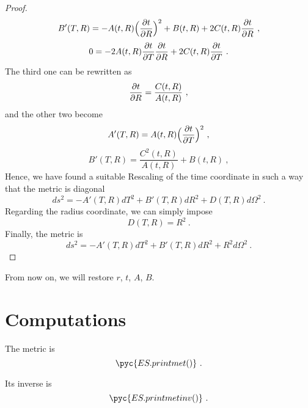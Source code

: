 \begin{proof}
\begin{equation*}
            B'(T, R) = - A (t,  R) \Big( \frac{\partial t}{\partial R} \Big)^2 + B(t, R) + 2 C(t,  R) \frac{\partial t}{\partial R}  ~,
        \end{equation*}
        \begin{equation*}
            0 = -2 A(t, R) \frac{\partial t}{\partial T} \frac{\partial t}{\partial R} + 2 C(t, R) \frac{\partial t}{\partial T} ~.
        \end{equation*}
        The third one can be rewritten as 
        \begin{equation*}
            \frac{\partial t}{\partial R} = \frac{C(t, R)}{A(t, R)} ~,
        \end{equation*}
        and the other two become 
        \begin{equation*}
            A'(T, R) = A (t,  R) \Big ( \frac{\partial t}{\partial T} \Big)^2 ~,
        \end{equation*}
        \begin{equation*}
            B'(T, R) = \frac{C^2(t, R)}{A(t, R)} + B(t, R) ~,
        \end{equation*}
        Hence, we have found a suitable  Rescaling of the time coordinate in such a way that the metric is diagonal
        \begin{equation*}
            ds^2 = - A'(T, R) dT^2 + B'(T,  R) d R^2 + D(T, R) d\Omega^2 ~.
        \end{equation*}
        Regarding the radius coordinate, we can simply impose
        \begin{equation*}
            D(T, R) = R^2 ~.
        \end{equation*}
        Finally, the metric is 
        \begin{equation*}
            ds^2 = - A'(T, R) dT^2 + B'(T, R) dR^2 + R^2 d\Omega^2 ~.
        \end{equation*}
    \end{proof}

    \noindent From now on, we will restore $r$, $t$, $A$, $B$.

\section{Computations}

    The metric is 
    \begin{equation*}
        \pyc{ES.printmet()} ~.
    \end{equation*}

    Its inverse is 
    \begin{equation*}
        \pyc{ES.printmetinv()} ~.
    \end{equation*}

